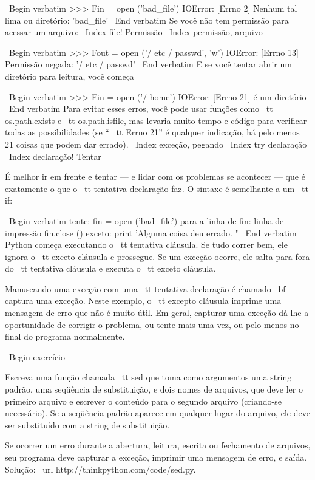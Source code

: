 \documentclass[10pt]{book}
\begin{document}
\begin {itemize}
{{{{{{{{{{\ Begin {verbatim}
>>> Fin = open ('bad_file')
IOError: [Errno 2] Nenhum tal lima ou diretório: 'bad_file'
\ End {verbatim}
%
Se você não tem permissão para acessar um arquivo:
\ Index {file! Permissão}
\ Index {permissão, arquivo}

\ Begin {verbatim}
>>> Fout = open ('/ etc / passwd', 'w')
IOError: [Errno 13] Permissão negada: '/ etc / passwd'
\ End {verbatim}
%
E se você tentar abrir um diretório para leitura, você começa

\ Begin {verbatim}
>>> Fin = open ('/ home')
IOError: [Errno 21] é um diretório
\ End {verbatim}
%
Para evitar esses erros, você pode usar funções como {\ tt os.path.exists}
e {\ tt os.path.isfile}, mas levaria muito tempo e código
para verificar todas as possibilidades (se `` {\ tt Errno 21}'' é qualquer
indicação, há pelo menos 21 coisas que podem dar errado).
\ Index {exceção, pegando}
\ Index {try declaração}
\ Index {declaração! Tentar}

É melhor ir em frente e tentar --- e lidar com os problemas se
acontecer --- que é exatamente o que o {\ tt tentativa} declaração faz. O
sintaxe é semelhante a um {\ tt if}:

\ Begin {verbatim}
tente:    
    fin = open ('bad_file')
    para a linha de fin:
        linha de impressão
    fin.close ()
exceto:
    print 'Alguma coisa deu errado. "
\ End {verbatim}
%
Python começa executando o {\ tt tentativa} cláusula. Se tudo correr
bem, ele ignora o {\ tt exceto} cláusula e prossegue. Se um
exceção ocorre, ele salta para fora do {\ tt tentativa} cláusula e
executa o {\ tt exceto} cláusula.

Manuseando uma exceção com uma {\ tt tentativa} declaração é chamado {\ bf
captura} uma exceção. Neste exemplo, o {\ tt excepto} cláusula
imprime uma mensagem de erro que não é muito útil. Em geral,
capturar uma exceção dá-lhe a oportunidade de corrigir o problema, ou tente
mais uma vez, ou pelo menos no final do programa normalmente.

\ Begin {} exercício

Escreva uma função chamada {\ tt sed} que toma como argumentos uma string padrão,
uma seqüência de substituição, e dois nomes de arquivos, que deve ler o primeiro arquivo
e escrever o conteúdo para o segundo arquivo (criando-se
necessário). Se a seqüência padrão aparece em qualquer lugar do arquivo, ele
deve ser substituído com a string de substituição.

Se ocorrer um erro durante a abertura, leitura, escrita ou fechamento de arquivos,
seu programa deve capturar a exceção, imprimir uma mensagem de erro, e
saída. Solução: \ url {http://thinkpython.com/code/sed.py}.

}}}}}}}}}}
\end{itemize}
\end{document}
